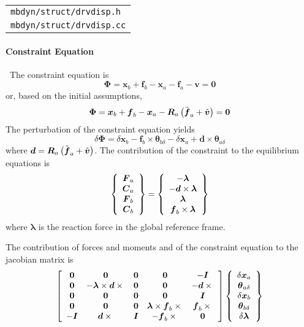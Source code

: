 \documentclass[10pt,dvips,fleqn]{report}
\newcommand{\T}[1]{\boldsymbol{#1}}
\begin{document}
\begin{tabular}{l}
\texttt{mbdyn/struct/drvdisp.h} \\
\texttt{mbdyn/struct/drvdisp.cc}
\end{tabular}

\paragraph{Constraint Equation} \
The constraint equation is
\begin{equation}
	\T{\Phi} = \T{x}_b + \T{f}_b - \T{x}_a - \T{f}_a - \T{v} = \T{0}
\end{equation}
or, based on the initial assumptions,
\begin{equation}
	\T{\Phi} = \T{x}_b + \T{f}_b - \T{x}_a
		- \T{R}_a\plbr{\tilde{\T{f}}_a + \tilde{\T{v}}} = \T{0}
\end{equation}
The perturbation of the constraint equation yields
\begin{equation}
	\delta\T{\Phi} = 
		\delta\T{x}_b
		- \T{f}_b\times\T{\theta}_{b\delta}
		- \delta\T{x}_a
		+ \T{d}\times\T{\theta}_{a\delta}
\end{equation}
where $\T{d}=\T{R}_a\plbr{\tilde{\T{f}}_a + \tilde{\T{v}}}$.
The contribution of the constraint to the equilibrium equations is
\begin{equation}
	\cubr{\cvvect{
		\T{F}_a \\
		\T{C}_a \\
		\T{F}_b \\
		\T{C}_b
	}} = \cubr{\cvvect{
		- \T{\lambda} \\
		- \T{d}\times\T{\lambda} \\
		\T{\lambda} \\
		\T{f}_b\times\T{\lambda}
	}}
\end{equation}
where $\T{\lambda}$ is the reaction force in the global reference frame.

The contribution of forces and moments and of the constraint equation 
to the jacobian matrix is
\begin{equation}
	\sqbr{\matr{ccccc}{
		\T{0} & \T{0} & \T{0} & \T{0} & - \T{I} \\
		\T{0} & - \T{\lambda}\times\T{d}\times{} & \T{0} & \T{0} & - \T{d}\times{}\\
		\T{0} & \T{0} & \T{0} & \T{0} & \T{I} \\
		\T{0} & \T{0} & \T{0} & \T{\lambda}\times\T{f}_b\times{} & \T{f}_b\times{} \\
		- \T{I} & \T{d}\times{} & \T{I} & - \T{f}_b\times{} & \T{0}
	}}\cubr{\cvvect{
		\delta\T{x}_a \\
		\T{\theta}_{a\delta} \\
		\delta\T{x}_b \\
		\T{\theta}_{b\delta} \\
		\delta\T{\lambda}
	}}
\end{equation}
\end{document}

